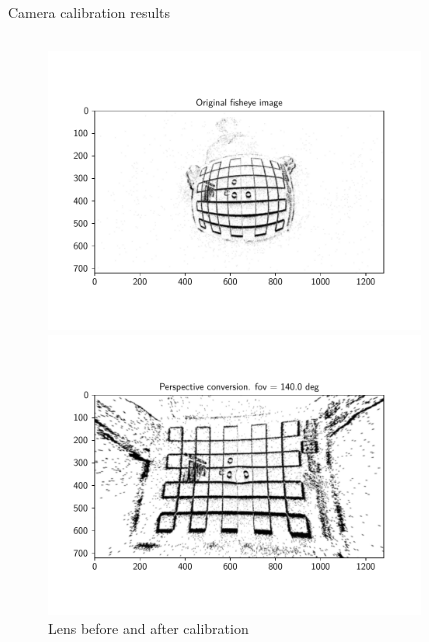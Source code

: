 \documentclass{beamer}
\begin{document}
\begin{frame}{Camera calibration results}
\begin{columns}[T]
    \begin{column}{0.49\textwidth}
        \vspace{-0.5cm}
        \begin{figure}
            \centering
            \includegraphics[width=0.88\textwidth]{./fig/pgfplot/build/ent_before.pdf}
            
            \vspace{-0.6cm}
            
            \includegraphics[width=0.88\textwidth]{./fig/pgfplot/build/ent_after.pdf}
            
            \caption{Lens before and after calibration}
            \label{fig:calib_after}
        \end{figure}
    \end{column}
\end{columns}

\end{frame}
\end{document}

